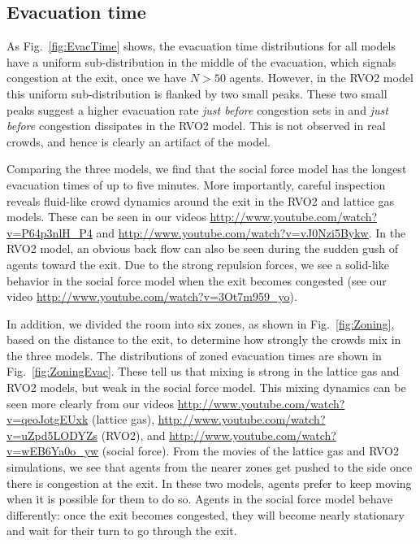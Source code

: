 \subsection{Evacuation time}
\label{EvacTime}

As Fig.~\ref{fig:EvacTime} shows, the evacuation time distributions for all models have a uniform sub-distribution in the middle of the evacuation, which signals congestion at the exit, once we have $N > 50$ agents. However, in the RVO2 model this uniform sub-distribution is flanked by two small peaks. These two small peaks suggest a higher evacuation rate \emph{just before} congestion sets in and \emph{just before} congestion dissipates in the RVO2 model. This is not observed in real crowds, and hence is clearly an artifact of the model.

Comparing the three models, we find that the social force model has the longest evacuation times of up to five minutes. More importantly, careful inspection reveals fluid-like crowd dynamics around the exit in the RVO2 and lattice gas models. These can be seen in our  videos \url{http://www.youtube.com/watch?v=P64p3nlH_P4} and  \url{http://www.youtube.com/watch?v=vJ0Nzi5Bykw}. In the RVO2 model, an obvious back flow can also be seen during the sudden gush of agents toward the exit. Due to the strong repulsion forces, we see a solid-like behavior in the social force model when the exit becomes congested (see our video \url{http://www.youtube.com/watch?v=3Ot7m959_yo}).

In addition, we divided the room into six zones, as shown in Fig.~\ref{fig:Zoning}, based on the distance to the exit, to determine how strongly the crowds mix in the three models. The distributions of zoned evacuation times are shown in Fig.~\ref{fig:ZoningEvac}. These tell us that mixing is strong in the lattice gas and RVO2 models, but weak in the social force model. This mixing dynamics can be seen more clearly from our videos \url{http://www.youtube.com/watch?v=qeoJotgEUxk} (lattice gas), \url{http://www.youtube.com/watch?v=uZpd5LODYZs} (RVO2), and \url{http://www.youtube.com/watch?v=wEB6Ya0o_yw} (social force).
From the movies of the lattice gas and RVO2 simulations, we see that agents from the nearer zones get pushed to the side once there is congestion at the exit. In these two models, agents prefer to keep moving when it is possible for them to do so. Agents in the social force model behave differently: once the exit becomes congested, they will become nearly stationary and wait for their turn to go through the exit.

